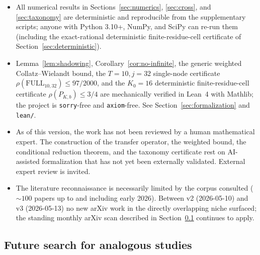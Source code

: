 \documentclass[11pt,a4paper]{article}
\theoremstyle{definition}
\newcommand{\full}{\mathrm{FULL}}
\newcommand{\spec}{\rho}
\begin{document}
\begin{itemize}
  \item All numerical results in Sections~\ref{sec:numerics},
        \ref{sec:cross}, and \ref{sec:taxonomy} are deterministic
        and reproducible from the supplementary scripts; anyone
        with Python 3.10+, NumPy, and SciPy can re-run them
        (including the exact-rational deterministic
        finite-residue-cell certificate of
        Section~\ref{sec:deterministic}).
  \item Lemma~\ref{lem:shadowing},
        Corollary~\ref{cor:no-infinite}, the generic
        weighted Collatz--Wielandt bound, the
        $T = 10, j = 32$ single-node certificate
        $\spec(\full_{10,32}) \le 97/2000$, and the $K_0 = 16$
        deterministic finite-residue-cell certificate
        $\spec(P_{K, b}) \le 3/4$ are mechanically verified
        in Lean~4 with Mathlib; the project is
        \texttt{sorry}-free and \texttt{axiom}-free. See
        Section~\ref{sec:formalization} and \texttt{lean/}.
  \item As of this version, the work has not been reviewed by a
        human mathematical expert. The construction of the
        transfer operator, the weighted bound, the conditional
        reduction theorem, and the taxonomy certificate rest on
        AI-assisted formalization that has not yet been
        externally validated. External expert review is invited.
  \item The literature reconnaissance is necessarily limited by
        the corpus consulted ($\sim 100$ papers up to and
        including early 2026). Between v2 (2026-05-10) and v3
        (2026-05-13) no new arXiv work in the directly
        overlapping niche surfaced; the standing monthly arXiv
        scan described in
        Section~\ref{sec:methodology-future-search} continues to
        apply.
\end{itemize}

\subsection{Future search for analogous studies}
\label{sec:methodology-future-search}
\end{document}
